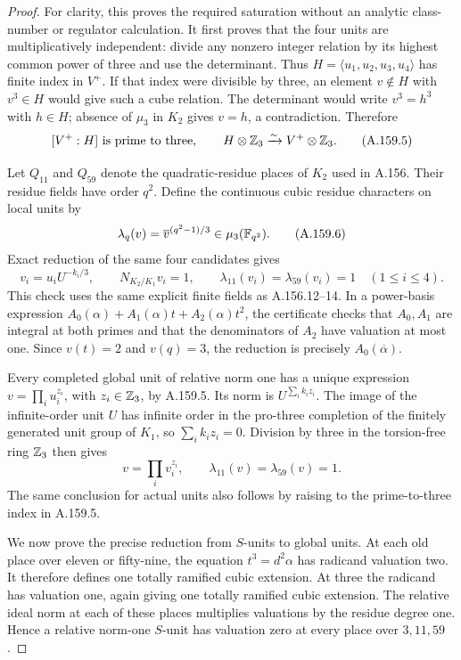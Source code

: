 \begin{proof}
For clarity, this proves the required saturation without an analytic
class-number or regulator calculation.  It first proves that the four
units are multiplicatively independent: divide any nonzero integer
relation by its highest common power of three and use the determinant.
Thus \(H=\langle u_1,u_2,u_3,u_4\rangle\) has finite index in \(V^+\).
If that index were divisible by three, an element \(v\notin H\) with
\(v^3\in H\) would give such a cube relation.  The determinant would
write \(v^3=h^3\) with \(h\in H\); absence of \(\mu_3\) in
\(K_2\) gives \(v=h\), a contradiction.  Therefore
\[
 [V^+:H]\ \text{is prime to three},\qquad
 H\otimes\Z_3\xrightarrow{\sim}V^+\otimes\Z_3.
\tag{A.159.5}
\]

Let \(Q_{11}\) and \(Q_{59}\) denote the quadratic-residue places of
\(K_2\) used in A.156.  Their residue fields have order \(q^2\).
Define the continuous cubic residue characters on local units by
\[
 \lambda_q(v)=\overline v^{(q^2-1)/3}\in\mu_3(\mathbb F_{q^2}).
\tag{A.159.6}
\]
Exact reduction of the same four candidates gives
\[
 v_i=u_iU^{-k_i/3},\qquad N_{K_2/K_1}v_i=1,
 \qquad \lambda_{11}(v_i)=\lambda_{59}(v_i)=1
 \quad(1\leq i\leq4).
\tag{A.159.7}
\]
This check uses the same explicit finite fields as A.156.12--14.
In a power-basis expression \(A_0(\alpha)+A_1(\alpha)t+
A_2(\alpha)t^2\), the certificate checks that \(A_0,A_1\) are integral
at both primes and that the denominators of \(A_2\) have valuation at
most one.  Since \(v(t)=2\) and \(v(q)=3\), the reduction is precisely
\(A_0(\overline\alpha)\).

Every completed global unit of relative norm one has a unique expression
\(v=\prod_i u_i^{z_i}\), with \(z_i\in\mathbb Z_3\), by A.159.5.
Its norm is \(U^{\sum_i k_i z_i}\).  The image of the infinite-order
unit \(U\) has infinite order in the pro-three completion of the
finitely generated unit group of \(K_1\), so
\(\sum_i k_i z_i=0\).  Division by three in the torsion-free ring
\(\mathbb Z_3\) then gives
\[
 v=\prod_i v_i^{z_i},\qquad
 \lambda_{11}(v)=\lambda_{59}(v)=1.
\tag{A.159.8}
\]
The same conclusion for actual units also follows by raising to the
prime-to-three index in A.159.5.

We now prove the precise reduction from $S$-units to global units.
At each old place over eleven or fifty-nine, the equation
\(t^3=d^2\alpha\) has radicand valuation two.  It therefore defines
one totally ramified cubic extension.  At three the radicand has
valuation one, again giving one totally ramified cubic extension.
The relative ideal norm at each of these places multiplies valuations
by the residue degree one.  Hence a relative norm-one $S$-unit has
valuation zero at every place over \(3,11,59\).


\end{proof}
